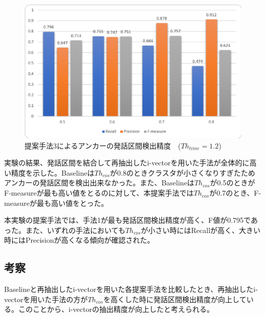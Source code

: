 \begin{figure}[H]
  \begin{center}
    \includegraphics[scale=0.8]{./figure/get_anchor_prob3.eps}
  \end{center}
  \caption{提案手法3によるアンカーの発話区間検出精度　($Th_{time}=1.2$) \label{fig:result_anchor_prob3}}
\end{figure}

実験の結果、発話区間を結合して再抽出したi-vectorを用いた手法が全体的に高い精度を示した。Baselineは$Th_{cos}$が0.8のときクラスタが小さくなりすぎたためアンカーの発話区間を検出出来なかった。また、Baselineは$Th_{cos}$が0.5のときがF-measureが最も高い値をとるのに対して、本提案手法では$Th_{cos}$が0.7のとき、F-measureが最も高い値をとった。\par
本実験の提案手法では、手法1が最も発話区間検出精度が高く、F値が0.795であった。また、いずれの手法においても$Th_{cos}$が小さい時にはRecallが高く、大きい時にはPrecisionが高くなる傾向が確認された。

\subsection{考察}
Baselineと再抽出したi-vectorを用いた各提案手法を比較したとき、再抽出したi-vectorを用いた手法の方が$Th_{cos}$を高くした時に発話区間検出精度が向上している。このことから、i-vectorの抽出精度が向上したと考えられる。\par

